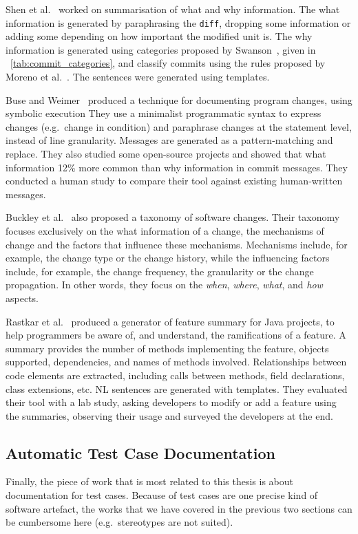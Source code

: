 \documentclass[a4paper,11pt]{sdm_internship}
\theoremstyle{definition}
\begin{document}
Shen et al.~\cite{shen2016automatic} worked on summarisation of what and why information.
The what information is generated by paraphrasing the \texttt{diff}, dropping some information or adding some depending on how important the modified unit is.
The why information is generated using categories proposed by Swanson~\cite{swanson1976dimensions}, given in \tablename~\ref{tab:commit_categories}, and classify commits using the rules proposed by Moreno et al.~\cite{moreno2012jstereocode}.
The sentences were generated using templates.

Buse and Weimer~\cite{buse2010automatically} produced a technique for documenting program changes, using symbolic execution
They use a minimalist programmatic syntax to express changes (e.g.\ change in condition) and paraphrase changes at the statement level, instead of line granularity.
Messages are generated as a pattern-matching and replace.
They also studied some open-source projects and showed that what information 12\% more common than why information in commit messages.
They conducted a human study to compare their tool against existing human-written messages.

Buckley et al.~\cite{buckley2005towards} also proposed a taxonomy of software changes.
Their taxonomy focuses exclusively on the what information of a change, the mechanisms of change and the factors that influence these mechanisms.
Mechanisms include, for example, the change type or the change history, while the influencing factors include, for example, the change frequency, the granularity or the change propagation.
In other words, they focus on the \textit{when}, \textit{where}, \textit{what}, and \textit{how} aspects.

Rastkar et al.~\cite{rastkar2011generating} produced a generator of feature summary for Java projects, to help programmers be aware of, and understand, the ramifications of a feature.
A summary provides the number of methods implementing the feature, objects supported, dependencies, and names of methods involved.
Relationships between code elements are extracted, including calls between methods, field declarations, class extensions, etc.
NL sentences are generated with templates.
They evaluated their tool with a lab study, asking developers to modify or add a feature using the summaries, observing their usage and surveyed the developers at the end.

\subsection{Automatic Test Case Documentation}%
\label{ssec:test_doc}
Finally, the piece of work that is most related to this thesis is about documentation for test cases.
Because of test cases are one precise kind of software artefact, the works that we have covered in the previous two sections can be cumbersome here (e.g.\ stereotypes are not suited).
\end{document}
